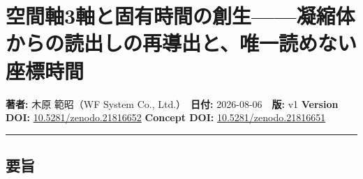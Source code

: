 \documentclass[
  a4paper,
]{ltjsarticle}
\author{}
\date{}
\begin{document}
\section{空間軸3軸と固有時間の創生------凝縮体からの読出しの再導出と、唯一読めない座標時間}\label{ux7a7aux9593ux8ef83ux8ef8ux3068ux56faux6709ux6642ux9593ux306eux5275ux751fux51ddux7e2eux4f53ux304bux3089ux306eux8aadux51faux3057ux306eux518dux5c0eux51faux3068ux552fux4e00ux8aadux3081ux306aux3044ux5ea7ux6a19ux6642ux9593}

\textbf{著者:} 木原 範昭（WF System Co., Ltd.）　\textbf{日付:}
2026-08-06　\textbf{版:} v1 \textbf{Version DOI:}
\href{https://doi.org/10.5281/zenodo.21816652}{10.5281/zenodo.21816652}
\textbf{Concept DOI:}
\href{https://doi.org/10.5281/zenodo.21816651}{10.5281/zenodo.21816651}

\begin{center}\rule{0.5\linewidth}{0.5pt}\end{center}

\subsection{要旨}\label{ux8981ux65e8}
\end{document}
